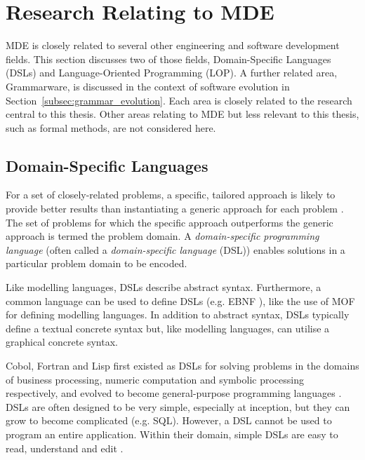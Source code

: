 
\section{Research Relating to MDE}
\label{sec:mde_related}
MDE is closely related to several other engineering and software development fields. This section discusses two of those fields, Domain-Specific Languages (DSLs) and Language-Oriented Programming (LOP). A further related area, Grammarware, is discussed in the context of software evolution in Section~\ref{subsec:grammar_evolution}. Each area is closely related to the research central to this thesis. Other areas relating to MDE but less relevant to this thesis, such as formal methods, are not considered here.

\subsection{Domain-Specific Languages}
\label{subsec:dsls}
For a set of closely-related problems, a specific, tailored approach is likely to provide better results than instantiating a generic approach for each problem \cite{deursen00dslbib}. The set of problems for which the specific approach outperforms the generic approach is termed the problem domain. A \textit{domain-specific programming language} (often called a \textit{domain-specific language} (DSL)) enables solutions in a particular problem domain to be encoded.

Like modelling languages, DSLs describe abstract syntax. Furthermore, a common language can be used to define DSLs (e.g. EBNF \cite{ebnf}), like the use of MOF for defining modelling languages. In addition to abstract syntax, DSLs typically define a textual concrete syntax but, like modelling languages, can utilise a graphical concrete syntax.

Cobol, Fortran and Lisp first existed as DSLs for solving problems in the domains of business processing, numeric computation and symbolic processing respectively, and evolved to become general-purpose programming languages \cite{deursen00dslbib}. DSLs are often designed to be very simple, especially at inception, but they can grow to become complicated (e.g. SQL). However, a DSL cannot be used to program an entire application. Within their domain, simple DSLs are easy to read, understand and edit \cite{fowler05language}.

